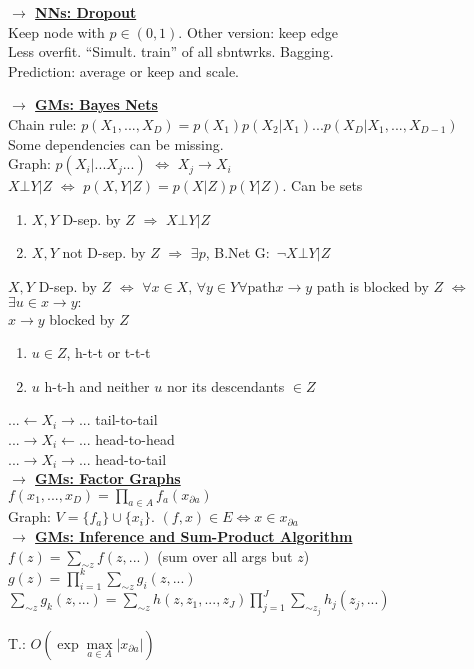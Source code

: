 \documentclass[]{article}
\newcommand{\mytitle}[1]{ {\bf $\rightarrow$ \underline{#1}}\\}
\begin{document}
\begin{multicols*}{2}
\mytitle{NNs: Dropout}
Keep node with $p\in(0,1)$. Other version: keep edge\\
Less overfit. ``Simult. train'' of all sbntwrks. Bagging.\\
Prediction: average or keep and scale.

\mytitle{GMs: Bayes Nets}
Chain rule: $p(X_1,...,X_D)=p(X_1)p(X_2|X_1)...p(X_D|X_1,...,X_{D-1})$\\
Some dependencies can be missing.\\
Graph: $p(X_i|...X_j...)$ $\Leftrightarrow$ $X_j\to X_i$\\
$X\bot Y|Z$ $\Leftrightarrow$ $p(X, Y|Z)=p(X|Z)p(Y|Z)$. Can be sets\\
\begin{enumerate}
	\item $X, Y$ D-sep. by $Z$ $\Rightarrow$ $X\bot Y|Z$
	\item $X, Y$ not D-sep. by $Z$ $\Rightarrow$ $\exists p$, B.Net G$\colon$ $\neg X\bot Y|Z$
\end{enumerate}
$X,Y$ D-sep. by $Z$ $\Leftrightarrow$ $\forall x\in X,\,\forall y\in Y \forall \mbox{path} x\to y$ path is blocked by $Z$ $\Leftrightarrow$ $\exists u\in x\to y\colon$\\
$x\to y$ blocked by $Z$
\begin{enumerate}
	\item $u\in Z$, h-t-t or t-t-t
	\item $u$ h-t-h and neither $u$ nor its descendants $\in Z$
\end{enumerate}
$...\leftarrow X_i\rightarrow...$ tail-to-tail\\
$...\rightarrow X_i\leftarrow...$ head-to-head\\
$...\rightarrow X_i\rightarrow...$ head-to-tail\\
\mytitle{GMs: Factor Graphs}
$f(x_1,...,x_D)=\prod\limits_{a\in A}f_a(x_{\partial a})$\\
Graph: $V=\{f_a\}\cup\{x_i\}$. $(f,x)\in E\Leftrightarrow x\in x_{\partial a}$\\

\mytitle{GMs: Inference and Sum-Product Algorithm}
$f(z)=\sum\limits_{\sim z}f(z,...)$ (sum over all args but $z$)\\
$g(z)=\prod\limits_{i=1}^k\sum\limits_{\sim z}g_i(z,...)$\\
$\sum\limits_{\sim z}g_k(z,...)=\sum\limits_{\sim z}h(z,z_1,...,z_J)\prod\limits_{j=1}^J\sum\limits_{\sim z_j}h_j(z_j,...)$

T.: $O\left(\exp \max\limits_{a\in A}|x_{\partial a}|\right)$
\end{multicols*}
\end{document}
